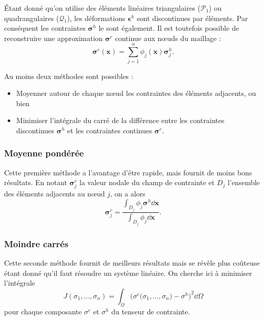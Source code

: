 \documentclass[12pt]{article}
\newcommand{\xx}{\mathbf{x}}
\newcommand{\stress}{\boldsymbol{\sigma}}
\newcommand{\strain}{\boldsymbol{\epsilon}}
\begin{document}
Étant donné qu'on utilise des éléments linéaires triangulaires ($\mathcal{P}_1$)
ou quadrangulaires ($\mathcal{Q}_1$), les déformations $\strain^h$ sont 
discontinues par éléments. Par conséquent les contraintes $\stress^h$ le sont
également.
Il est toutefois possible de reconstruire une approximation $\stress^c$ 
continue aux n\oe uds du maillage :
\begin{equation}
    \stress^c(\xx) = \sum_{j=1}^{n} \phi_j(\xx) \stress_j^h.
\end{equation}

Au moins deux méthodes sont possibles :
\begin{itemize}
    \item Moyenner autour de chaque n\oe ud les contraintes des éléments 
    adjacents, ou bien
    \item Minimiser l'intégrale du carré de la différence entre les contraintes
    discontinues $\stress^h$ et les contraintes continues $\stress^c$.
\end{itemize}

\subsubsection{Moyenne pondérée}
Cette première méthode a l'avantage d'être rapide, mais fournit de moins bons
résultats. En notant $\stress_j^c$ la valeur nodale du champ de contrainte
et $D_j$ l'ensemble des éléments adjacents au n\oe ud $j$, on a alors
\begin{equation}
    \stress^c_j = \frac{\displaystyle\int_{D_j} \phi_j \stress^h \dd \xx}{
        \displaystyle\int_{D_j} \phi_j \dd \xx}.
\end{equation}

\subsubsection{Moindre carrés}
Cette seconde méthode fournit de meilleurs résultats mais se révèle plus 
coûteuse étant donné qu'il faut résoudre un système linéaire.
On cherche ici à minimiser l'intégrale
\begin{equation}
    J(\sigma_1, \dots, \sigma_n) = 
        \int_{\Omega} \Big(
            \sigma^c\big(\sigma_1,\dots, \sigma_n\big) - \sigma^h
        \Big)^2 \dd \Omega
\end{equation}
pour chaque composante $\sigma^c$ et $\sigma^h$ du tenseur de contrainte.
\end{document}
